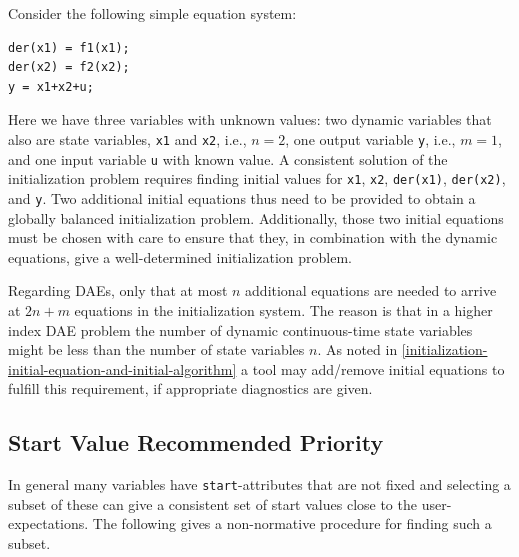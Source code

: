 \begin{example}
Consider the following simple equation system:
\begin{lstlisting}[language=modelica]
der(x1) = f1(x1);
der(x2) = f2(x2);
y = x1+x2+u;
\end{lstlisting}

Here we have three variables with unknown values: two dynamic variables that also are state variables, \lstinline!x1! and \lstinline!x2!, i.e., $n=2$, one output variable \lstinline!y!, i.e., $m=1$, and one input variable \lstinline!u! with known value.
A consistent solution of the initialization problem requires finding initial values for \lstinline!x1!, \lstinline!x2!, \lstinline!der(x1)!, \lstinline!der(x2)!, and \lstinline!y!.
Two additional initial equations thus need to be provided to obtain a globally balanced initialization problem.
Additionally, those two initial equations must be chosen with care to ensure that they, in combination with the dynamic equations, give a well-determined initialization problem.

Regarding DAEs, only that at most $n$ additional equations are needed to arrive at $2n+m$ equations in the initialization system.
The reason is that in a higher index DAE problem the number of dynamic continuous-time state variables might be less than the number of state variables $n$.
As noted in \cref{initialization-initial-equation-and-initial-algorithm} a tool may add/remove initial equations to fulfill this requirement, if appropriate diagnostics are given.
\end{example}


\subsection{Start Value Recommended Priority}\label{recommended-selection-of-start-values}\label{start-value-recommended-priority}

In general many variables have \lstinline!start!-attributes that are not fixed and selecting a subset of these can give a consistent set of start values close to the user-expectations.
The following gives a non-normative procedure for finding such a subset.

